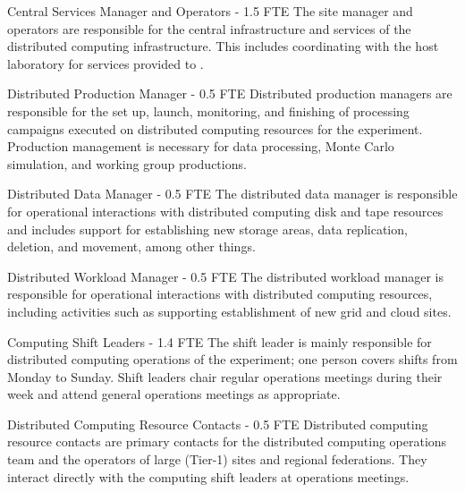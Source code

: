 \begin{description}
\item {Central Services Manager and Operators - 1.5 FTE}
The site manager and operators are responsible for the central infrastructure and services of the  distributed computing infrastructure. This includes coordinating with the host laboratory for services provided to . %

\item {Distributed Production Manager - 0.5 FTE}
Distributed production managers are responsible for the set up, launch, monitoring, and finishing of processing campaigns executed on distributed computing resources for the experiment. Production management is necessary for data processing, Monte Carlo simulation, and working group productions.%

\item {Distributed Data Manager - 0.5 FTE}
The distributed data manager is responsible for operational interactions with distributed computing disk and tape resources and includes support for establishing new storage areas, data replication, deletion, and movement, among other things. %

\item {Distributed Workload Manager - 0.5 FTE}
The distributed workload manager is responsible for operational interactions with distributed computing resources, including activities such as supporting establishment of new grid and cloud sites. %



\item {Computing Shift Leaders - 1.4 FTE}
The shift leader is mainly responsible for distributed computing operations of the experiment; one person covers shifts from Monday to Sunday.  Shift leaders chair regular operations meetings during their week and attend general  operations meetings as appropriate. %

\item {Distributed Computing Resource Contacts - 0.5 FTE}
Distributed computing resource contacts are primary contacts for the  distributed computing operations team and the operators of large (Tier-1) sites and regional federations. They interact directly with the computing shift leaders at operations meetings. %


\end{description}
